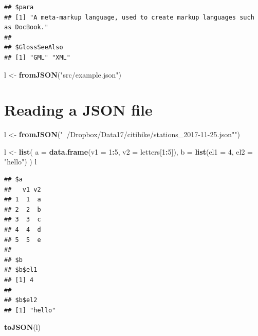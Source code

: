 \documentclass[]{book}
\newenvironment{Shaded}{\begin{snugshade}}{\end{snugshade}}
\newcommand{\KeywordTok}[1]{\textcolor[rgb]{0.13,0.29,0.53}{\textbf{#1}}}
\newcommand{\DataTypeTok}[1]{\textcolor[rgb]{0.13,0.29,0.53}{#1}}
\newcommand{\DecValTok}[1]{\textcolor[rgb]{0.00,0.00,0.81}{#1}}
\newcommand{\StringTok}[1]{\textcolor[rgb]{0.31,0.60,0.02}{#1}}
\newcommand{\OperatorTok}[1]{\textcolor[rgb]{0.81,0.36,0.00}{\textbf{#1}}}
\newcommand{\NormalTok}[1]{#1}
\theoremstyle{definition}
\theoremstyle{definition}
\theoremstyle{definition}
\theoremstyle{remark}
\begin{document}
\begin{verbatim}
## $para
## [1] "A meta-markup language, used to create markup languages such as DocBook."
## 
## $GlossSeeAlso
## [1] "GML" "XML"
\end{verbatim}

\begin{Shaded}
\begin{Highlighting}[]
\NormalTok{l <-}\StringTok{ }\KeywordTok{fromJSON}\NormalTok{(}\StringTok{"src/example.json"}\NormalTok{)}
\end{Highlighting}
\end{Shaded}

\section{Reading a JSON file}\label{reading-a-json-file}

\begin{Shaded}
\begin{Highlighting}[]
\NormalTok{l <-}\StringTok{ }\KeywordTok{fromJSON}\NormalTok{(}\StringTok{"~/Dropbox/Data17/citibike/stations_2017-11-25.json"")}
\end{Highlighting}
\end{Shaded}

\begin{Shaded}
\begin{Highlighting}[]
\NormalTok{l <-}\StringTok{ }\KeywordTok{list}\NormalTok{(}
  \DataTypeTok{a =} \KeywordTok{data.frame}\NormalTok{(}\DataTypeTok{v1 =} \DecValTok{1}\OperatorTok{:}\DecValTok{5}\NormalTok{, }\DataTypeTok{v2 =}\NormalTok{ letters[}\DecValTok{1}\OperatorTok{:}\DecValTok{5}\NormalTok{]),}
  \DataTypeTok{b =} \KeywordTok{list}\NormalTok{(}\DataTypeTok{el1 =} \DecValTok{4}\NormalTok{, }\DataTypeTok{el2 =} \StringTok{"hello"}\NormalTok{)}
\NormalTok{)}
\NormalTok{l}
\end{Highlighting}
\end{Shaded}

\begin{verbatim}
## $a
##   v1 v2
## 1  1  a
## 2  2  b
## 3  3  c
## 4  4  d
## 5  5  e
## 
## $b
## $b$el1
## [1] 4
## 
## $b$el2
## [1] "hello"
\end{verbatim}

\begin{Shaded}
\begin{Highlighting}[]
\KeywordTok{toJSON}\NormalTok{(l)}
\end{Highlighting}
\end{Shaded}
\end{document}
